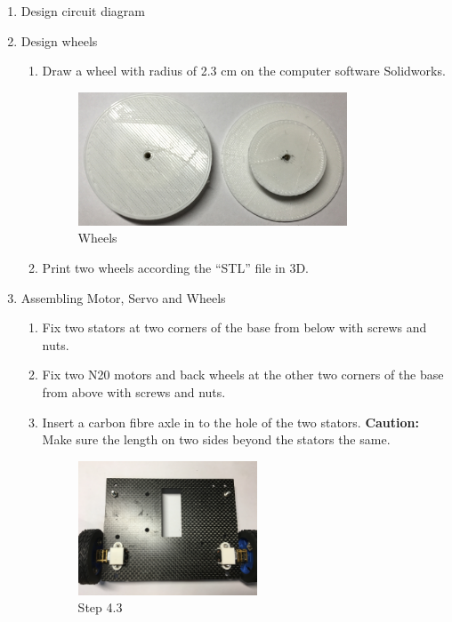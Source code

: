 \begin{enumerate}
\begin{enumerate}
	\end{enumerate}
\item Design circuit diagram 
\item Design wheels
	\begin{enumerate}
	\item Draw a wheel with radius of 2.3 cm on the computer software Solidworks.
	\begin{figure}[H]
	\begin{center}
	\includegraphics[width=8cm]{figure/procedure/p3}
	\end{center}
 	\caption{Wheels \label{fig:wheels}}
	\end{figure}
	\item Print two wheels according the ``STL'' file in 3D.
	\end{enumerate}
\item Assembling Motor, Servo and Wheels
	\begin{enumerate}
	\item Fix two stators at two corners of the base from below with screws and nuts. 
	\item Fix two N20 motors and back wheels at the other two corners of the base from above with screws and nuts.
	\item Insert a carbon fibre axle in to the hole of the two stators. \textbf{Caution:} Make sure the length on two sides beyond the stators the same. 
	\begin{figure}[H]
	\begin{minipage}{0.48\textwidth}
	\centering
	\includegraphics[height=4cm]{figure/procedure/p4}
 	\caption{Step 4.3 \label{fig:step43}}
	\end{minipage}
	\begin{minipage}{0.48\textwidth}

\end{minipage}
\end{figure}
\end{enumerate}
\end{enumerate}
